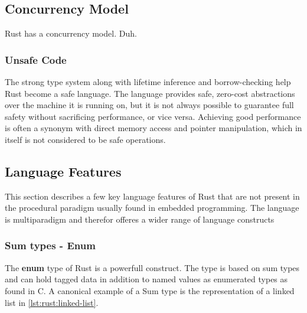 

\subsection{Concurrency Model} %
\label{ssub:concurrency_model}

Rust has a concurrency model. Duh.


\subsubsection{Unsafe Code} %
\label{ssub:unsafe_code}

The strong type system along with lifetime inference and borrow-checking help Rust become a safe language.
The language provides safe, zero-cost abstractions over the machine it is running on, but it is not always possible to guarantee full safety without sacrificing performance, or vice versa.
Achieving good performance is often a synonym with direct memory access and pointer manipulation, which in itself is not considered to be safe operations.


\subsection{Language Features}

This section describes a few key language features of Rust that are not present in the procedural paradigm usually found in embedded programming.
The language is multiparadigm and therefor offeres a wider range of language constructs

\subsubsection{Sum types - Enum}

The \textbf{enum} type of Rust is a powerfull construct.
The type is based on sum types and can hold tagged data in addition to named values as enumerated types as found in C.
A canonical example of a Sum type is the representation of a linked list in \ref{lst:rust:linked-list}.

